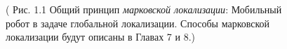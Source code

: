\documentclass[10pt,a4paper]{article}
\begin{document}
\begin{figure}
	\caption{ (  Рис. 1.1 Общий принцип \textit{марковской локализации}: Мобильный робот в задаче глобальной локализации. Способы марковской локализации будут описаны в Главах 7 и 8.)}
	\label{fig:11orig}
\end{figure}
\end{document}
